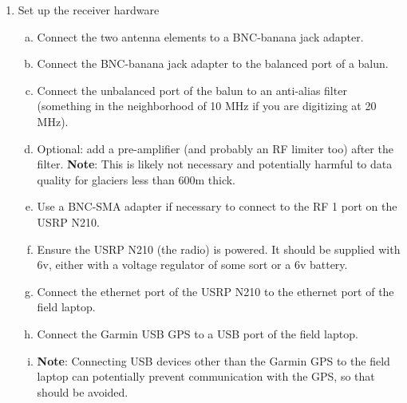 \documentclass[titlepage]{article}
\begin{document}
\begin{enumerate}[1.]
    \item Set up the receiver hardware \begin{enumerate}[(a)]
        \item Connect the two antenna elements to a BNC-banana jack adapter.
        \item Connect the BNC-banana jack adapter to the balanced port of a balun.
        \item Connect the unbalanced port of the balun to an anti-alias filter (something in the neighborhood of 10 MHz if you are digitizing at 20 MHz).
        \item Optional: add a pre-amplifier (and probably an RF limiter too) after the filter. \textbf{Note}: This is likely not necessary and potentially harmful to data quality for glaciers less than 600m thick.
        \item Use a BNC-SMA adapter if necessary to connect to the RF 1 port on the USRP N210.
        \item Ensure the USRP N210 (the radio) is powered. It should be supplied with 6v, either with a voltage regulator of some sort or a 6v battery.
        \item Connect the ethernet port of the USRP N210 to the ethernet port of the field laptop. 
        \item Connect the Garmin USB GPS to a USB port of the field laptop. 
        \item \textbf{Note}: Connecting USB devices other than the Garmin GPS to the field laptop can potentially prevent communication with the GPS, so that should be avoided.
    \end{enumerate}


\end{enumerate}
\end{document}
